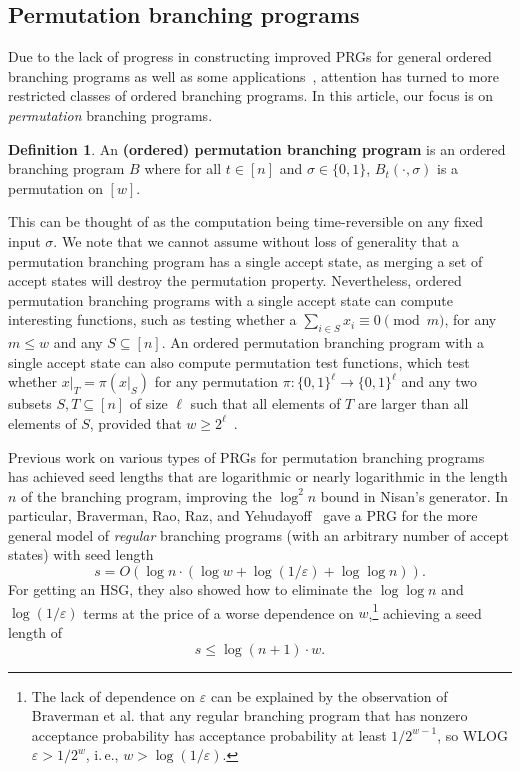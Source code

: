 \documentclass[11pt]{article}
\numberwithin{equation}{section}
\theoremstyle{definition}
\newtheorem{definition}[theorem]{Definition}
\theoremstyle{plain}
\newcommand{\ie}{i.\,e.}
\newcommand{\eps}{\varepsilon}
\newcommand{\zo}{\{0,1\}}
\begin{document}
	
\subsection{Permutation branching programs}\label{subsec:PBP_overview}

Due to the lack of progress in constructing improved PRGs for general ordered branching programs as well as some applications~\cite{Indyk06,KaplanNaRe05}, attention has turned to more restricted classes of ordered branching programs.  In this %
article, %
our focus is on \emph{permutation} branching programs. %
	
	\begin{definition}\label{def:prbp}An \textbf{(ordered) permutation branching program} is an ordered branching program $B$ where for all $t \in [n]$ and $\sigma \in \zo$, $B_t(\cdot,\sigma)$ is a permutation on $[w]$. 
	\end{definition}
	This can be thought of as the computation being time-reversible on any fixed input $\sigma$. We note that we cannot assume without loss of generality that a permutation branching program has a single accept state, as merging a set of accept states will destroy the permutation property. Nevertheless, ordered permutation branching programs with a single accept state can compute interesting functions, such as testing
	whether a $\sum_{i\in S} x_i \equiv 0 \pmod m$, for any $m\leq w$ and any $S\subseteq [n]$.  An ordered permutation branching program with a single accept state can also compute permutation test functions, which test whether $x|_T = \pi(x|_S)$ for any permutation $\pi : \zo^\ell\rightarrow \zo^\ell$ and any two subsets $S,T\subseteq [n]$ of size $\ell$ such that all elements of $T$ are larger than all elements of $S$, provided that $w\geq 2^{\ell}$~\cite{HozaPyVa21}.
	
	Previous %
work %
on various types of PRGs for permutation branching programs~\cite{RozenmanVa05,ReingoldTrVa06,BravermanRaRaYe10,KouckyNiPu11,De11,Steinke12,HozaPyVa21} %
has  %
achieved seed lengths that are logarithmic or nearly logarithmic in the length $n$ of the branching program, improving the $\log^2 n$ bound in Nisan's generator. In particular, Braverman, Rao,
Raz, and Yehudayoff~\cite{BravermanRaRaYe10} gave a PRG for the more general model of \emph{regular} branching programs (with an arbitrary number of accept states) with seed length
	$$s=O\left(\log n\cdot (\log w + \log(1/\eps)+\log\log n)\right).$$
For getting an %
    HSG, they also showed how to %
    eliminate
	the $\log\log n$ and $\log(1/\eps)$ terms at the price of a worse dependence on $w$,\footnote{The lack of dependence on $\eps$ can be explained by the observation of Braverman et al. that any regular branching program that 
	has nonzero acceptance probability has acceptance probability at least
	$1/2^{w-1}$, so WLOG $\eps> 1/2^w$, \ie, $w> \log(1/\eps)$.} 
	achieving a seed length of
	$$s\leq \log(n+1) \cdot w.$$
\end{document}
